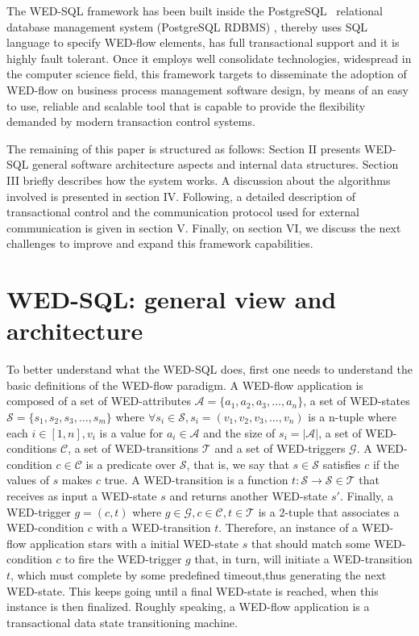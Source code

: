 \documentclass[conference]{IEEEtran}
\begin{document}
\par The WED-SQL framework has been built inside the PostgreSQL~\cite{PSQL} relational database management system (PostgreSQL RDBMS)
, thereby uses SQL language
to specify WED-flow elements, has full transactional support and it is highly fault tolerant. Once it employs well consolidate 
technologies, widespread in the computer science field, this framework targets to disseminate the adoption of WED-flow on
business process management software design, by means of an easy to use, reliable and scalable tool that is capable to 
provide the flexibility demanded by modern transaction control systems. 

\par The remaining of this paper is structured as follows: Section II presents WED-SQL general software architecture aspects and
internal data structures. Section III briefly describes how the system works. A discussion about the algorithms involved
is presented in section IV. Following, a detailed description of transactional control and the communication protocol used
for external communication is given in section V. Finally, on section VI, we discuss the next challenges to improve and
expand this framework capabilities.  
  

\section{WED-SQL: general view and architecture}

To better understand what the WED-SQL does, first one needs to understand the basic definitions of the WED-flow paradigm. 
A WED-flow application is composed of a set of WED-attributes $\mathcal{A} = \{a_1,a_2,a_3,\ldots,a_n\}$, a set of WED-states
$\mathcal{S} = \{s_1,s_2,s_3,\ldots,s_m\}$ where $ \forall s_i \in \mathcal{S}, s_i = (v_1,v_2,v_3,\ldots,v_n)$
is a n-tuple where each $i\in[1,n], v_i$ is a value for $a_i \in \mathcal{A}$ and the size of $s_i = |\mathcal{A}|$, a set of
WED-conditions $\mathcal{C}$, a set of WED-transitions $\mathcal{T}$ and a set of WED-triggers $\mathcal{G}$. A WED-condition
$c \in \mathcal{C}$ is a predicate over $\mathcal{S}$, that is, we say that $s \in \mathcal{S}$ satisfies $c$ if the values
of $s$ makes $c$ true. A WED-transition is a function $t: \mathcal{S}\rightarrow\mathcal{S} \in \mathcal{T}$ that receives 
as input a WED-state $s$ and returns another WED-state $s'$. Finally, a WED-trigger $g = (c,t)$ where $g \in \mathcal{G},
c \in \mathcal{C}, t \in \mathcal{T}$ is a 2-tuple that associates a WED-condition $c$ with a WED-transition $t$. Therefore,
an instance of a WED-flow application stars with a initial WED-state $s$ that should match some WED-condition $c$ to fire
the WED-trigger $g$ that, in turn, will initiate a WED-transition $t$, which must complete by some predefined timeout,thus 
generating the next WED-state. This keeps going until a final WED-state is reached, when this instance is then finalized. 
Roughly speaking, a WED-flow application is a transactional data state transitioning machine.
\end{document}
